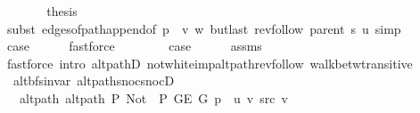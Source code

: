\begin{isabellebody}
\ \ \ \ \isamarkupfalse%
\ \isamarkupfalse%
\ {\isacharquery}{\kern0pt}thesis\isanewline
\ \ \ \ \ \ \isamarkupfalse%
\ {\isacharparenleft}{\kern0pt}subst\ edges{\isacharunderscore}{\kern0pt}of{\isacharunderscore}{\kern0pt}path{\isacharunderscore}{\kern0pt}append{\isacharunderscore}{\kern0pt}{}{\isacharbrackleft}{\kern0pt}of\ {\isachardoublequoteopen}p\ {\isacharat}{\kern0pt}\ {\isacharbrackleft}{\kern0pt}v{\isacharcomma}{\kern0pt}\ w{\isacharbrackright}{\kern0pt}{\isachardoublequoteclose}\ {\isachardoublequoteopen}butlast\ {\isacharparenleft}{\kern0pt}rev{\isacharunderscore}{\kern0pt}follow\ {\isacharparenleft}{\kern0pt}parent\ s{\isacharparenright}{\kern0pt}\ u{\isacharparenright}{\kern0pt}{\isachardoublequoteclose}{\isacharbrackright}{\kern0pt}{\isacharparenright}{\kern0pt}\ simp{\isacharplus}{\kern0pt}\isanewline
\ \ \isamarkupfalse%
\isanewline
\ \ \isamarkupfalse%
\ \isamarkupfalse%
\ {\isacharquery}{\kern0pt}case\isanewline
\ \ \ \ \isamarkupfalse%
\ fastforce\isanewline
{}\isamarkupfalse%
\isanewline
\ \ \isamarkupfalse%
\ {}\isanewline
\ \ \isamarkupfalse%
\ {\isacharquery}{\kern0pt}case\isanewline
\ \ \ \ \isamarkupfalse%
\ assms\isanewline
\ \ \ \ \isamarkupfalse%
\ {\isacharparenleft}{\kern0pt}fastforce\ intro{\isacharcolon}{\kern0pt}\ alt{\isacharunderscore}{\kern0pt}pathD{\isacharparenleft}{\kern0pt}{}{\isacharparenright}{\kern0pt}\ not{\isacharunderscore}{\kern0pt}white{\isacharunderscore}{\kern0pt}imp{\isacharunderscore}{\kern0pt}alt{\isacharunderscore}{\kern0pt}path{\isacharunderscore}{\kern0pt}rev{\isacharunderscore}{\kern0pt}follow\ walk{\isacharunderscore}{\kern0pt}betw{\isacharunderscore}{\kern0pt}transitive{\isacharunderscore}{\kern0pt}{}{\isacharparenright}{\kern0pt}\isanewline
{}\isamarkupfalse%
%
\endisatagproof
{\isafoldproof}%
%
\isadelimproof
\isanewline
%
\endisadelimproof
\isanewline
{}\isamarkupfalse%
\ {\isacharparenleft}{\kern0pt}\ alt{\isacharunderscore}{\kern0pt}bfs{\isacharunderscore}{\kern0pt}invar{\isacharparenright}{\kern0pt}\ alt{\isacharunderscore}{\kern0pt}path{\isacharunderscore}{\kern0pt}snoc{\isacharunderscore}{\kern0pt}snocD{\isacharcolon}{\kern0pt}\isanewline
\ \ \ alt{\isacharunderscore}{\kern0pt}path{\isacharcolon}{\kern0pt}\ {\isachardoublequoteopen}alt{\isacharunderscore}{\kern0pt}path\ P{\isacharprime}{\kern0pt}{\isacharprime}{\kern0pt}\ {\isacharparenleft}{\kern0pt}Not\ {\isasymcirc}\ P{\isacharprime}{\kern0pt}{\isacharprime}{\kern0pt}{\isacharparenright}{\kern0pt}\ {\isacharparenleft}{\kern0pt}G{\isachardot}{\kern0pt}E\ G{\isacharparenright}{\kern0pt}\ {\isacharparenleft}{\kern0pt}p\ {\isacharat}{\kern0pt}\ {\isacharbrackleft}{\kern0pt}u{\isacharcomma}{\kern0pt}\ v{\isacharbrackright}{\kern0pt}{\isacharparenright}{\kern0pt}\ src\ v{\isachardoublequoteclose}\isanewline

\end{isabellebody}
